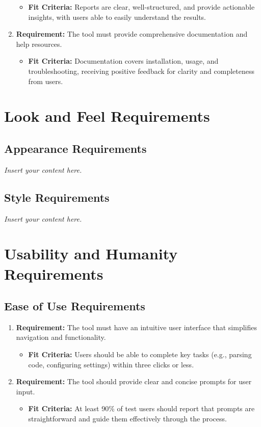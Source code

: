 \documentclass[12pt]{article}
\newcommand{\lips}{\textit{Insert your content here.}}
\begin{document}
\begin{enumerate}
  \begin{itemize}[label={}]
      \item \textbf{Fit Criteria:}  Reports are clear, well-structured, and provide actionable insights, with users able to easily understand the results.
  \end{itemize}
  \item \textbf{Requirement:} The tool must provide comprehensive documentation and help resources.
  \begin{itemize}[label={}]
      \item \textbf{Fit Criteria:} Documentation covers installation, usage, and troubleshooting, receiving positive feedback for clarity and completeness from users.
  \end{itemize}
\end{enumerate}

\section{Look and Feel Requirements}
\subsection{Appearance Requirements}
\lips
\subsection{Style Requirements}
\lips

\section{Usability and Humanity Requirements}
\subsection{Ease of Use Requirements}
\begin{enumerate}
  \item \textbf{Requirement:} The tool must have an intuitive user interface that simplifies navigation and functionality.
  \begin{itemize}[label={}]
      \item \textbf{Fit Criteria:}  Users should be able to complete key tasks (e.g., parsing code, configuring settings) within three clicks or less.
  \end{itemize}
  \item \textbf{Requirement:} The tool should provide clear and concise prompts for user input.
  \begin{itemize}[label={}]
      \item \textbf{Fit Criteria:} At least 90\% of test users should report that prompts are straightforward and guide them effectively through the process.
  \end{itemize}
\end{enumerate}
\end{document}
